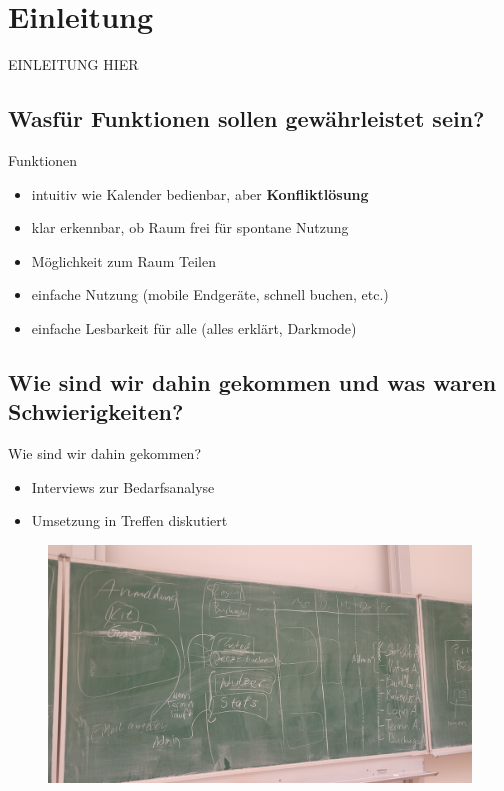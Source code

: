 \section{Einleitung}

\begin{frame}{}{}
    EINLEITUNG HIER
\end{frame}

\subsection[nötige Funktionen]{Wasfür Funktionen sollen gewährleistet sein?}

\begin{frame}{Funktionen}
    \begin{itemize}
        \item intuitiv wie Kalender bedienbar, aber \textrightarrow \textbf{Konfliktlösung}
        \item klar erkennbar, ob Raum frei für spontane Nutzung
        \item Möglichkeit zum Raum Teilen
        \item einfache Nutzung (mobile Endgeräte, schnell buchen, etc.)
        \item einfache Lesbarkeit für alle (alles erklärt, Darkmode)
    \end{itemize}
\end{frame}

\subsection[Werdegang und Schwierigkeiten]{Wie sind wir dahin gekommen und was waren Schwierigkeiten?}

\begin{frame}{Wie sind wir dahin gekommen?}
    \begin{itemize}
        \item Interviews zur Bedarfsanalyse
        \item Umsetzung in Treffen diskutiert
    \end{itemize}
\end{frame}

\begin{frame}
    \begin{figure}
        \centering
        \includegraphics[width=0.6\linewidth]{pictures/BrainstormTafelbild}
        \label{fig: Tafelbild Brainstorm}
    \end{figure}
\end{frame}

